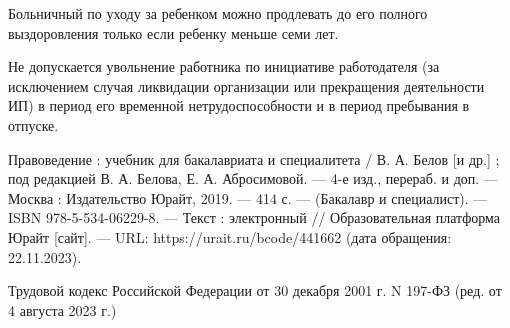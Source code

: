 \documentclass[14pt,a4paper]{extarticle}
\begin{document}
Больничный по уходу за ребенком можно продлевать до его полного выздоровления только если ребенку меньше семи лет.

Не допускается увольнение работника по инициативе работодателя (за исключением случая ликвидации организации или прекращения деятельности ИП) в период его временной нетрудоспособности и в период пребывания в отпуске.


%
\begin{thebibliography}{3}


 Правоведение : учебник для бакалавриата и специалитета / В. А. Белов [и др.] ; под редакцией В. А. Белова, Е. А. Абросимовой. — 4-е изд., перераб. и доп. — Москва : Издательство Юрайт, 2019. — 414 с. — (Бакалавр и специалист). — ISBN 978-5-534-06229-8. — Текст : электронный // Образовательная платформа Юрайт [сайт]. — URL: https://urait.ru/bcode/441662 (дата обращения: 22.11.2023). 


 Трудовой кодекс Российской Федерации от 30 декабря 2001 г. N 197-ФЗ (ред. от 4 августа 2023 г.)

\end{thebibliography}


%
%
\end{document}
